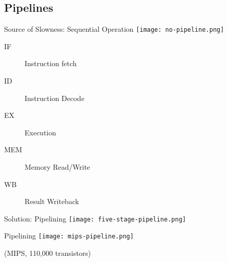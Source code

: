 \documentclass[english,compress]{beamer}
\begin{document}
\subsection{Pipelines}
\begin{frame}{Source of Slowness: Sequential Operation}
  \texttt{[image: no-pipeline.png]}
  \begin{description}
    \item[IF] Instruction fetch
    \item[ID] Instruction Decode
    \item[EX] Execution
    \item[MEM] Memory Read/Write
    \item[WB] Result Writeback
  \end{description}
\end{frame}
\begin{frame}{Solution: Pipelining}
  \texttt{[image: five-stage-pipeline.png]}
\end{frame}
\begin{frame}{Pipelining}
  \texttt{[image: mips-pipeline.png]}

  \small (MIPS, 110,000 transistors)
\end{frame}
\end{document}
